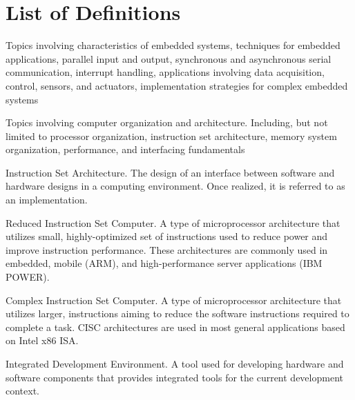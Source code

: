 
\chapter*{List of Definitions}

\begin{definition} 
	Topics involving characteristics of embedded systems, techniques for embedded applications, parallel input and output, synchronous and asynchronous serial communication, interrupt handling, applications involving data acquisition, control, sensors, and actuators, implementation strategies for complex embedded systems \cite[p.~118]{cec2016}
\end{definition}

\begin{definition} 
	Topics involving computer organization and architecture. Including, but not limited to processor organization, instruction set architecture, memory system organization, performance, and interfacing fundamentals\cite[p.~118]{cec2016}
\end{definition}

\begin{definition}[ISA]
    Instruction Set Architecture. The design of an interface between software and hardware designs in a computing environment. Once realized, it is referred to as an implementation. 
\end{definition}

\begin{definition}[RISC]
    Reduced Instruction Set Computer. A type of microprocessor architecture that utilizes small, highly-optimized set of instructions used to reduce power and improve instruction performance\cite{Aletan1992, Stokes1999}. These architectures are commonly used in embedded, mobile (ARM), and high-performance server applications (IBM POWER). 
\end{definition}

\begin{definition}[CISC]
    Complex Instruction Set Computer. A type of microprocessor architecture that utilizes larger, instructions aiming to reduce the software instructions required to complete a task\cite{Aletan1992, Stokes1999}. CISC architectures are used in most general applications based on Intel\textregistered{} x86 ISA\cite{intel2017}.
\end{definition}

\begin{definition}[IDE]
    Integrated Development Environment. A tool used for developing hardware and software components that provides integrated tools for the current development context. 
\end{definition}
